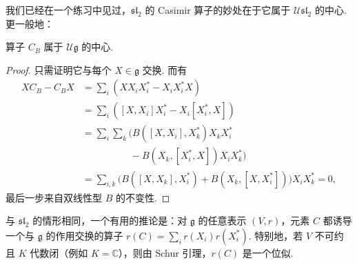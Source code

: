 我们已经在一个练习中见过，$\mathfrak{sl}_2$ 的 Casimir 算子的妙处在于它属于 $\mathcal U\mathfrak{sl}_2$ 的中心. 更一般地：
\begin{proposition*}
算子 $C_B$ 属于 $\mathcal U\mathfrak g$ 的中心.
\end{proposition*}
\begin{proof}
只需证明它与每个 $X\in\mathfrak g$ 交换. 而有
\begin{align*}
XC_B-C_BX
&=\sum_i(XX_iX_i^*-X_iX_i^*X)\\
&=\sum_i([X,X_i]X_i^*-X_i[X_i^*,X])\\
&=\sum_i\sum_k\bigl(B([X,X_i],X_k^*)X_kX_i^*\\
&\hspace{5em}{}-B(X_k,[X_i^*,X])X_iX_k^*\bigr)\\
&=\sum_{i,k}\bigl(B([X,X_k],X_i^*)+B(X_k,[X,X_i^*])\bigr)X_iX_k^*=0,
\end{align*}
最后一步来自双线性型 $B$ 的不变性.
\end{proof}
与 $\mathfrak{sl}_2$ 的情形相同，一个有用的推论是：对 $\mathfrak g$ 的任意表示 $(V,r)$，元素 $C$ 都诱导一个与 $\mathfrak g$ 的作用交换的算子 $r(C)=\sum_ir(X_i)r(X_i^*)$. 特别地，若 $V$ 不可约且 $K$ 代数闭（例如 $K=\mathbb C$），则由 Schur 引理，$r(C)$ 是一个位似.
